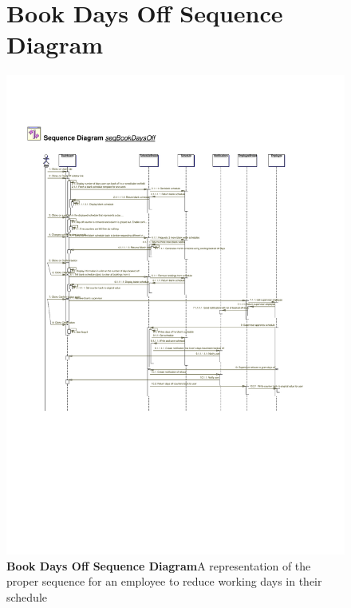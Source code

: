 \documentclass[letterpaper,12pt]{report}
\begin{document}
\begin{figure}[hbp]
 \section{Book Days Off Sequence Diagram}
 \includegraphics[scale=0.65]{externals/SequenceDiagrams12.pdf}
 \caption{\small
\textbf{Book Days Off Sequence Diagram}\newline A representation of the proper sequence for an employee to reduce working days in their schedule}\label{fig:seqBookDaysOff}
\end{figure}
\newpage
\end{document}
